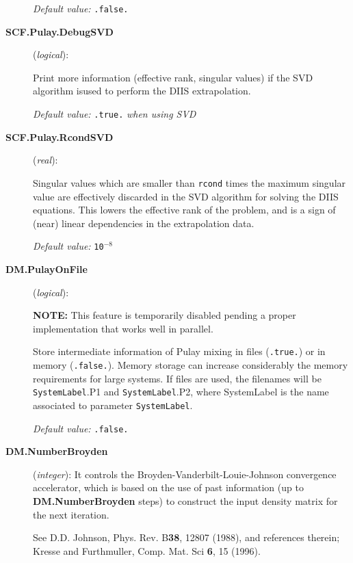 \begin{description}
\textit{Default value:} \texttt{.false.}

\item[\textbf{SCF.Pulay.DebugSVD}] (\textit{logical}):

Print more information (effective rank, singular values) if the SVD algorithm
isused to perform the DIIS extrapolation.

\textit{Default value:} {\texttt{.true.} \textit{when using SVD}}

\item[\textbf{SCF.Pulay.RcondSVD}] (\textit{real}):

Singular values which are smaller than \texttt{rcond} times the maximum
singular value are effectively discarded in the SVD algorithm for
solving the DIIS equations. This lowers the effective rank of the
problem, and is a sign of (near) linear dependencies in the
extrapolation data.

\textit{Default value:} \texttt{10$^{-8}$}


\item[\textbf{DM.PulayOnFile}] (\textit{logical}):

\textbf{NOTE:} This feature is temporarily disabled pending a proper
implementation that works well in parallel.

Store intermediate information of Pulay mixing in files
(\texttt{.true.}) or in memory (\texttt{.false.}).
Memory storage can increase considerably the
memory requirements for large systems.
If files are used, the filenames will be
\texttt{SystemLabel}.P1 and
\texttt{SystemLabel}.P2,
where SystemLabel is the name associated
to parameter \texttt{SystemLabel}.

\textit{Default value:} \texttt{.false.}



\item[\textbf{DM.NumberBroyden}] (\textit{integer}):
It controls the Broyden-Vanderbilt-Louie-Johnson
convergence accelerator, which is based on the use of past information
(up to \textbf{DM.NumberBroyden} steps) to construct the input density
matrix for the next iteration.

See D.D. Johnson, Phys. Rev. B\textbf{38}, 12807 (1988), and references therein;
Kresse and Furthmuller, Comp. Mat. Sci \textbf{6}, 15 (1996).


\end{description}
